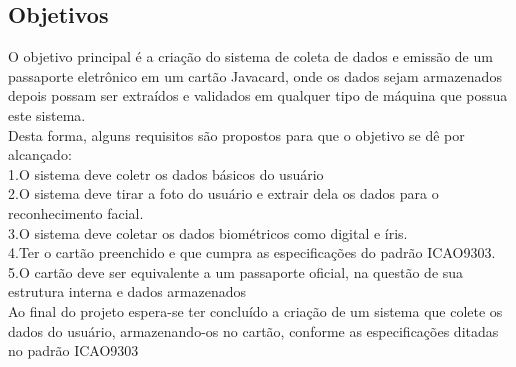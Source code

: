 \documentclass{article}
\begin{document}
	\subsection{Objetivos}
		\begin{justify}
				
			\hspace{2cm}O objetivo principal é a criação do sistema de coleta de dados e emissão de um passaporte eletrônico em um cartão Javacard, onde os dados sejam armazenados depois possam ser extraídos e validados em qualquer tipo de máquina que possua este sistema.\\
			\hspace*{2cm}Desta forma, alguns requisitos são propostos para que o objetivo se dê por alcançado:\\
				\hspace*{3cm}1.O sistema deve coletr os dados básicos do usuário\\
				\hspace*{3cm}2.O sistema deve tirar a foto do usuário e extrair dela os dados para o reconhecimento facial.\\
				\hspace*{3cm}3.O sistema deve coletar os dados biométricos como digital e íris.\\
				\hspace*{3cm}4.Ter o cartão preenchido e que cumpra as especificações do padrão ICAO9303.\\
				\hspace*{3cm}5.O cartão deve ser equivalente a um passaporte oficial, na questão de sua estrutura interna e dados armazenados\\
			\hspace*{2cm}Ao final do projeto espera-se ter concluído a criação de um sistema que colete os dados do usuário, armazenando-os no cartão, conforme as especificações ditadas no padrão ICAO9303

			
		\end{justify}
\end{document}
